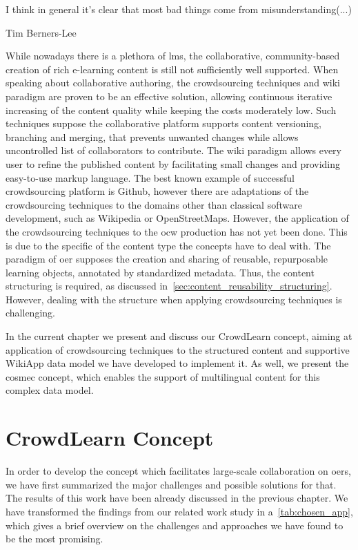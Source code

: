 \documentclass[PhD, Submit, ngerman,UKenglish,table]{scrbook}
\begin{document}
\epigraph{I think in general it's clear that most bad things come from misunderstanding(...)}{Tim Berners-Lee}

While nowadays there is a plethora of \gls{lms}, the collaborative, community-based creation of rich e-learning content is still not sufficiently well supported.
When speaking about collaborative authoring, the crowdsourcing techniques and wiki paradigm are proven to be an effective solution, allowing continuous iterative increasing of the content quality while keeping the costs moderately low.
Such techniques suppose the collaborative platform supports content versioning, branching and merging, that prevents unwanted changes while allows uncontrolled list of collaborators to contribute.
The wiki paradigm allows every user to refine the published content by facilitating small changes and providing easy-to-use markup language.
The best known example of successful crowdsourcing platform is Github, however there are adaptations of the crowdsourcing techniques to the domains other than classical software development, such as Wikipedia or OpenStreetMaps.
However, the application of the crowdsourcing techniques to the \gls{ocw} production has not yet been done.
This is due to the specific of the content type the concepts have to deal with.
The paradigm of \gls{oer} supposes the creation and sharing of reusable, repurposable learning objects, annotated by standardized metadata.
Thus, the content structuring is required, as discussed in~\autoref{sec:content_reusability_structuring}.
However, dealing with the structure when applying crowdsourcing techniques is challenging.

In the current chapter we present and discuss our CrowdLearn concept, aiming at application of crowdsourcing techniques to the structured content and supportive WikiApp data model we have developed to implement it.
As well, we present the \gls{cosmec} concept, which enables the support of multilingual content for this complex data model.


\section{CrowdLearn Concept}
\label{sec:CrowdLearn}

In order to develop the concept which facilitates large-scale collaboration on \gls{oer}s, we have first summarized the major challenges and possible solutions for that.
The results of this work have been already discussed in the previous chapter.
We have transformed the findings from our related work study in a~\autoref{tab:chosen_app}, which gives a brief overview on the challenges and approaches we have found to be the most promising. 
\end{document}
